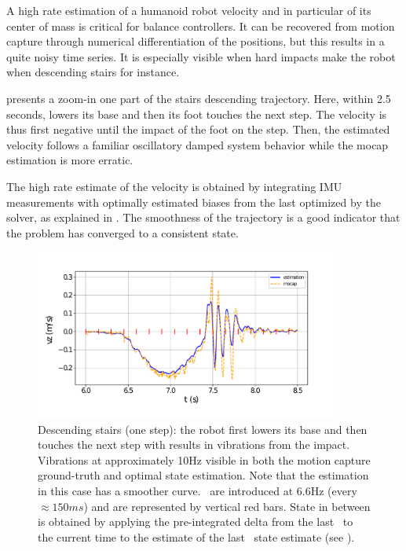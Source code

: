 A high rate estimation of a humanoid robot velocity and in particular of its center of mass is critical for balance controllers. It can be recovered 
from motion capture through numerical differentiation of the positions, but this results in a quite noisy time series. It is especially visible when hard impacts 
make the robot when descending stairs for instance.

 presents a zoom-in one part of the stairs descending trajectory. Here, within 2.5 seconds,  lowers 
its base and then its foot touches the next step. The velocity is thus first negative until the impact of the foot on the step. Then, the estimated velocity follows 
a familiar oscillatory damped system behavior while the mocap estimation is more erratic. 

The high rate estimate of the velocity is obtained by integrating IMU measurements with optimally estimated biases from the last \keyframe 
optimized by the solver, as explained in . The smoothness of the trajectory is a good indicator that the problem has converged to a consistent state.


\begin{figure}[h]
    \centering
    \includegraphics[width=0.9\textwidth]{figures/absolute/vz_descending_onestep_with_kf.pdf}
    \caption{Descending stairs (one step): the robot first lowers its base and then touches the next step with results in vibrations from the impact.
    Vibrations at approximately 10Hz visible in both the motion capture ground-truth and optimal state estimation. Note that the estimation in this case has a smoother curve.
    \keyframes\ are introduced at 6.6Hz (every $\approx 150 ms$) and are represented by vertical red bars. State in between is obtained by applying the pre-integrated 
    delta from the last \keyframe\ to the current time to the estimate of the last \keyframe\ state estimate (see ).}
    \label{fig:vz_descending_onestep}
\end{figure}




